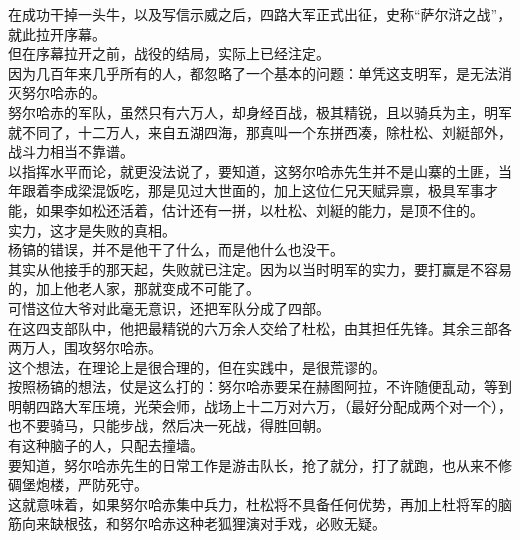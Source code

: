 \begin{multicols}{\theparacolNo}
在成功干掉一头牛，以及写信示威之后，四路大军正式出征，史称“萨尔浒之战”，就此拉开序幕。\\

但在序幕拉开之前，战役的结局，实际上已经注定。\\

因为几百年来几乎所有的人，都忽略了一个基本的问题：单凭这支明军，是无法消灭努尔哈赤的。\\

努尔哈赤的军队，虽然只有六万人，却身经百战，极其精锐，且以骑兵为主，明军就不同了，十二万人，来自五湖四海，那真叫一个东拼西凑，除杜松、刘綎部外，战斗力相当不靠谱。\\

以指挥水平而论，就更没法说了，要知道，这努尔哈赤先生并不是山寨的土匪，当年跟着李成梁混饭吃，那是见过大世面的，加上这位仁兄天赋异禀，极具军事才能，如果李如松还活着，估计还有一拼，以杜松、刘綎的能力，是顶不住的。\\

实力，这才是失败的真相。\\

杨镐的错误，并不是他干了什么，而是他什么也没干。\\

其实从他接手的那天起，失败就已注定。因为以当时明军的实力，要打赢是不容易的，加上他老人家，那就变成不可能了。\\

可惜这位大爷对此毫无意识，还把军队分成了四部。\\

在这四支部队中，他把最精锐的六万余人交给了杜松，由其担任先锋。其余三部各两万人，围攻努尔哈赤。\\

这个想法，在理论上是很合理的，但在实践中，是很荒谬的。\\

按照杨镐的想法，仗是这么打的：努尔哈赤要呆在赫图阿拉，不许随便乱动，等到明朝四路大军压境，光荣会师，战场上十二万对六万，（最好分配成两个对一个），也不要骑马，只能步战，然后决一死战，得胜回朝。\\

有这种脑子的人，只配去撞墙。\\

要知道，努尔哈赤先生的日常工作是游击队长，抢了就分，打了就跑，也从来不修碉堡炮楼，严防死守。\\

这就意味着，如果努尔哈赤集中兵力，杜松将不具备任何优势，再加上杜将军的脑筋向来缺根弦，和努尔哈赤这种老狐狸演对手戏，必败无疑。\\


\end{multicols}
